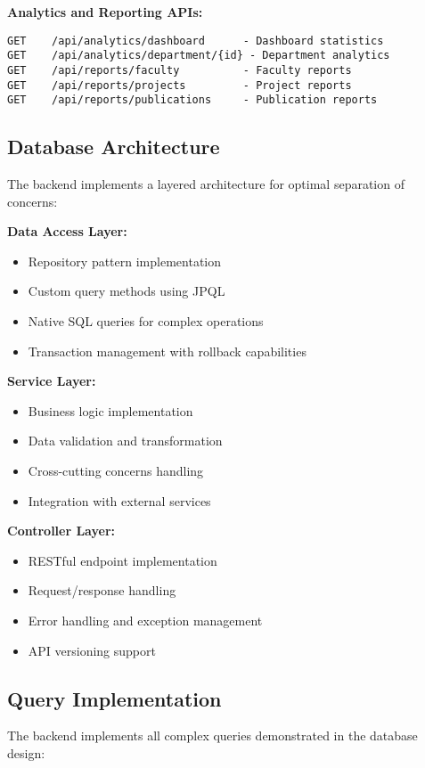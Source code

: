 \documentclass[12pt,a4paper]{article}
\begin{document}
\textbf{Analytics and Reporting APIs:}
\begin{lstlisting}[style=sqlstyle]
GET    /api/analytics/dashboard      - Dashboard statistics
GET    /api/analytics/department/{id} - Department analytics
GET    /api/reports/faculty          - Faculty reports
GET    /api/reports/projects         - Project reports
GET    /api/reports/publications     - Publication reports
\end{lstlisting}

\subsection{Database Architecture}
The backend implements a layered architecture for optimal separation of concerns:

\textbf{Data Access Layer:}
\begin{itemize}
    \item Repository pattern implementation
    \item Custom query methods using JPQL
    \item Native SQL queries for complex operations
    \item Transaction management with rollback capabilities
\end{itemize}

\textbf{Service Layer:}
\begin{itemize}
    \item Business logic implementation
    \item Data validation and transformation
    \item Cross-cutting concerns handling
    \item Integration with external services
\end{itemize}

\textbf{Controller Layer:}
\begin{itemize}
    \item RESTful endpoint implementation
    \item Request/response handling
    \item Error handling and exception management
    \item API versioning support
\end{itemize}

\subsection{Query Implementation}
The backend implements all complex queries demonstrated in the database design:
\end{document}

